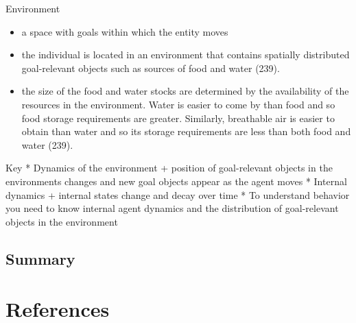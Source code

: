 \documentclass[english,,man]{apa6}
\providecommand{\tightlist}{%
  \setlength{\itemsep}{0pt}\setlength{\parskip}{0pt}}
\theoremstyle{definition}
\theoremstyle{definition}
\theoremstyle{definition}
\theoremstyle{remark}
\begin{document}
Environment

\begin{itemize}
\tightlist
\item
  a space with goals within which the entity moves
\item
  the individual is located in an environment that contains spatially
  distributed goal-relevant objects such as sources of food and water
  (239).
\item
  the size of the food and water stocks are determined by the
  availability of the resources in the environment. Water is easier to
  come by than food and so food storage requirements are greater.
  Similarly, breathable air is easier to obtain than water and so its
  storage requirements are less than both food and water (239).
\end{itemize}

Key * Dynamics of the environment + position of goal-relevant objects in
the environments changes and new goal objects appear as the agent moves
* Internal dynamics + internal states change and decay over time * To
understand behavior you need to know internal agent dynamics and the
distribution of goal-relevant objects in the environment

\hypertarget{summary-2}{%
\subsection{Summary}\label{summary-2}}

\newpage

\hypertarget{references}{%
\section{References}\label{references}}

\setlength{\parindent}{-0.5in}
\setlength{\leftskip}{0.5in}
\end{document}
